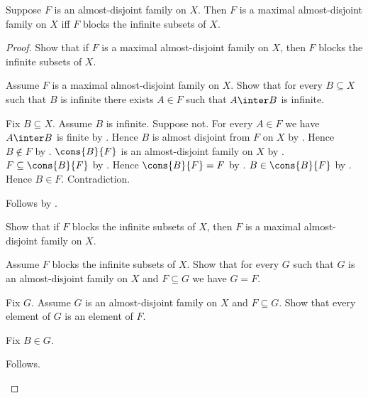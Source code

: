 \begin{theorem}\label{maximal_almost_disjoint_iff_blocking}
    Suppose $F$ is an almost-disjoint family on $X$.
    Then $F$ is a maximal almost-disjoint family on $X$ iff
        $F$ blocks the infinite subsets of $X$.
\end{theorem}
\begin{proof}
    Show that if $F$ is a maximal almost-disjoint family on $X$,
        then $F$ blocks the infinite subsets of $X$.
    \begin{subproof}
        Assume $F$ is a maximal almost-disjoint family on $X$.
        Show that for every $B\subseteq X$ such that $B$ is infinite
            there exists $A\in F$ such that $A\inter B$ is infinite.
        \begin{subproof}
            Fix $B\subseteq X$.
            Assume $B$ is infinite.
            Suppose not.
            For every $A\in F$ we have $A\inter B$ is finite
                by \auto.
            Hence $B$ is almost disjoint from $F$ on $X$
                by .
            Hence $B\notin F$
                by .
            $\cons{B}{F}$ is an almost-disjoint family on $X$
                by .
            $F\subseteq\cons{B}{F}$ by .
            Hence $\cons{B}{F}=F$
                by .
            $B\in\cons{B}{F}$ by .
            Hence $B\in F$.
            Contradiction.
        \end{subproof}
        Follows by .
    \end{subproof}
    Show that if $F$ blocks the infinite subsets of $X$, then
        $F$ is a maximal almost-disjoint family on $X$.
    \begin{subproof}
        Assume $F$ blocks the infinite subsets of $X$.
        Show that for every $G$ such that
            $G$ is an almost-disjoint family on $X$ and
            $F\subseteq G$ we have $G=F$.
        \begin{subproof}
            Fix $G$.
            Assume $G$ is an almost-disjoint family on $X$ and
                $F\subseteq G$.
            Show that every element of $G$ is an element of $F$.
            \begin{subproof}
                Fix $B\in G$.
                \begin{byCase}
                        Follows.

\end{byCase}
\end{subproof}
\end{subproof}
\end{subproof}
\end{proof}
